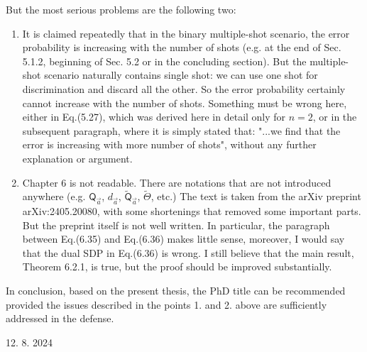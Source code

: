 \documentclass{article}
\begin{document}
But the most serious problems are the following two:

\begin{enumerate}
\item It is claimed repeatedly that in the binary multiple-shot scenario, the error
probability is increasing with the number of shots (e.g. at the end of Sec. 5.1.2,
beginning of Sec. 5.2 or in the concluding section). But the multiple-shot scenario naturally
contains single shot: we can use one shot for discrimination and discard all the other. So
the error probability certainly cannot increase with the number of shots. Something must
be wrong here, either in Eq.(5.27), which was derived here in detail only for $n=2$, or in the
subsequent paragraph, where it is simply stated that: "...we find that the error is
increasing with more number of shots", without any further explanation or argument.

\item Chapter 6 is not readable. There are notations that are
not introduced anywhere (e.g. $\mathsf{Q}_{\vec{a}}$, $d_{\vec{a}}$,
$\tilde{\mathsf{Q}}_{\vec{a}}$, $\tilde \Theta$, etc.) 
The text is taken from the arXiv preprint arXiv:2405.20080, with some shortenings that
removed some important parts. But the preprint itself is not well written. In particular,
the paragraph between Eq.(6.35) and Eq.(6.36) makes little sense, moreover, I would say
that the dual SDP in Eq.(6.36) is wrong. I still believe that the main result, Theorem
6.2.1, is true, but the proof should be improved substantially.



\end{enumerate}


In conclusion, based on the present thesis, the PhD title can be recommended provided the
issues described in the points 1. and 2. above are sufficiently addressed in the defense.



\vfill

12. 8. 2024            \hfill   
\begin{minipage}{0.25\textwidth}
\end{minipage}
\bigskip

\bigskip


 
\end{document}
